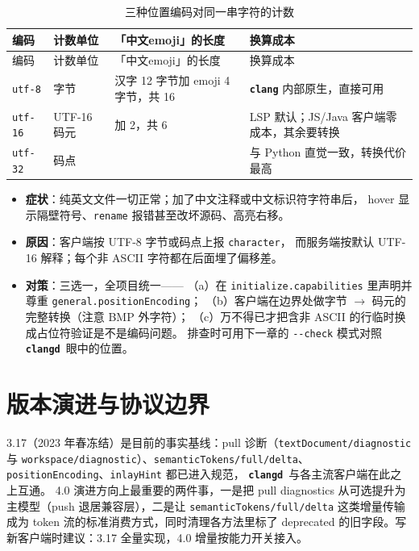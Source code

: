 \documentclass[12pt,a4paper,fontset=fandol]{ctexbook}
\newcommand{\Opt}[1]{\texttt{-\/-#1}}
\newcommand{\Lib}[1]{\textbf{\texttt{#1}}}
\newcommand{\CD}{\Lib{clangd}}
\begin{document}
\begin{longtable}{>{\raggedright\arraybackslash}p{}
                  >{\raggedright\arraybackslash}p{}
                  >{\raggedright\arraybackslash}p{}
                  >{\raggedright\arraybackslash}p{}}
\caption{三种位置编码对同一串字符的计数}\label{tab:ch04-enc}\\
\toprule
编码 & 计数单位 & 「中文emoji」的长度 & 换算成本 \\
\midrule
\endfirsthead
\toprule
编码 & 计数单位 & 「中文emoji」的长度 & 换算成本 \\
\midrule
\endhead
\texttt{utf-8} & 字节 & 4 汉字 12 字节加 emoji 4 字节，共 16 & \Lib{clang} 内部原生，直接可用 \\
\midrule
\texttt{utf-16} & UTF-16 码元 & 4 加 2，共 6 & LSP 默认；JS/Java 客户端零成本，其余要转换 \\
\midrule
\texttt{utf-32} & 码点 & 5 & 与 Python 直觉一致，转换代价最高 \\
\bottomrule
\end{longtable}

\begin{warning}[title={中文注释导致补全、悬停、改名集体错位}]
\begin{itemize}
  \item \textbf{症状}：纯英文文件一切正常；加了中文注释或中文标识符字符串后，
        hover 显示隔壁符号、\texttt{rename} 报错甚至改坏源码、高亮右移。
  \item \textbf{原因}：客户端按 UTF-8 字节或码点上报 \texttt{character}，
        而服务端按默认 UTF-16 解释；每个非 ASCII 字符都在后面埋了偏移差。
  \item \textbf{对策}：三选一，全项目统一——
        （a）在 \texttt{initialize.capabilities} 里声明并尊重
        \texttt{general.positionEncoding}；
        （b）客户端在边界处做字节 $\to$ 码元的完整转换（注意 BMP 外字符）；
        （c）万不得已才把含非 ASCII 的行临时换成占位符验证是不是编码问题。
        排查时可用下一章的 \Opt{check} 模式对照 \CD\ 眼中的位置。
\end{itemize}
\end{warning}

\section{版本演进与协议边界}\label{sec:ch04-s6}

3.17（2023 年春冻结）是目前的事实基线：pull 诊断（\texttt{textDocument/diagnostic}
与 \texttt{workspace/diagnostic}）、\texttt{semanticTokens/full/delta}、
\texttt{positionEncoding}、\texttt{inlayHint} 都已进入规范，
\CD\ 与各主流客户端在此之上互通。
4.0 演进方向上最重要的两件事，一是把 pull diagnostics 从可选提升为
主模型（push 退居兼容层），二是让 \texttt{semanticTokens/full/delta}
这类增量传输成为 token 流的标准消费方式，同时清理各方法里标了
deprecated 的旧字段。写新客户端时建议：3.17 全量实现，4.0 增量按能力开关接入。
\end{document}
